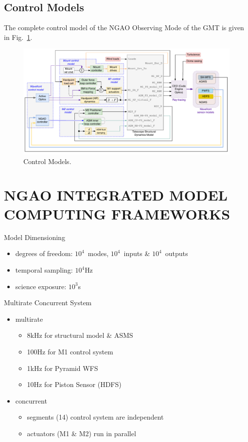 \documentclass[]{AO4ELT}  %
\begin{document}
\clearpage

\subsection{Control Models}
\label{sec:control}

The complete control model of the NGAO Observing Mode of the GMT is given in Fig.~\ref{fig:15}.

\begin{figure}
   \centering
   \includegraphics[width=\linewidth]{end2end_ngao-ngao-im-e2e.drawio.pdf}
   \caption{Control Models.}
   \label{fig:15}
\end{figure}

\section{NGAO INTEGRATED MODEL COMPUTING FRAMEWORKS}
\label{sec:framework}

{Model Dimensioning}
\begin{itemize}
   \item degrees of freedom: $10^4$~modes, $10^4$~inputs \& $10^4$~outputs
   \item temporal sampling: $10^4$Hz
   \item science exposure: $10^3$s
\end{itemize}

{Multirate Concurrent System}
\begin{itemize}
   \item multirate
         \begin{itemize}
            \item 8kHz for structural model \& ASMS
            \item 100Hz for M1 control system
            \item 1kHz for Pyramid WFS
            \item 10Hz for Piston Sensor (HDFS)
         \end{itemize}
   \item concurrent
         \begin{itemize}
            \item segments (14) control system are independent
            \item actuators (M1 \& M2) run in parallel
         \end{itemize}
\end{itemize}
\end{document}

